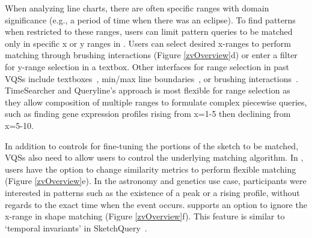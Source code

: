 \par When analyzing line charts,
there are often specific ranges with
domain significance (e.g., a period of time when there was an eclipse). 
To find patterns when restricted to these ranges, 
users can limit pattern queries 
to be matched only in specific x or y ranges in \zvpp. Users can select desired x-ranges 
to perform matching through brushing interactions 
(Figure \ref{zvOverview}d) 
or enter a filter for y-range selection in a textbox. 
Other interfaces for range selection in past VQSs 
include textboxes~\cite{wattenberg2001sketching,Mannino2018}, 
min/max line boundaries~\cite{ryall2005querylines}, 
or brushing interactions~\cite{Hochheiser2001}. 
TimeSearcher and Queryline's approach is 
most flexible for range selection as 
they allow composition of multiple ranges 
to formulate complex piecewise queries, 
such as finding gene expression profiles 
rising from x=1-5 then declining from x=5-10. 
\par In addition to controls for fine-tuning
the portions of the sketch to be matched,
VQSs also need to allow users
to control the underlying matching algorithm. 
In \zvpp, users have the option to change 
similarity metrics to perform 
flexible matching (Figure \ref{zvOverview}e). 
In the astronomy and genetics use case, 
participants were interested in patterns 
such as the existence of a peak or a rising profile, 
without regards to the exact time when the event occurs. 
\zvpp supports an option to ignore 
the x-range in shape matching (Figure \ref{zvOverview}f). 
This feature is similar to `temporal invariants' in SketchQuery~\cite{correll2016semantics}.
